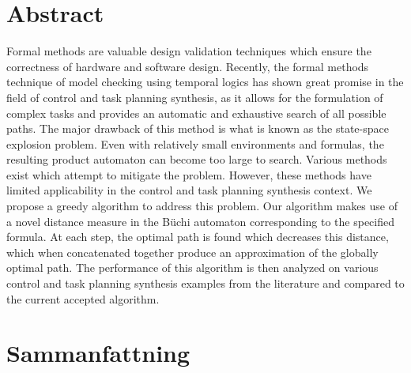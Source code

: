 \section*{\centering Abstract}
Formal methods are valuable design validation techniques which ensure the correctness of hardware and software design. Recently, the formal methods technique of model checking using temporal logics has shown great promise in the field of control and task planning synthesis, as it allows for the formulation of complex tasks and provides an automatic and exhaustive search of all possible paths. The major drawback of this method is what is known as the state-space explosion problem. Even with relatively small environments and formulas, the resulting product automaton can become too large to search. Various methods exist which attempt to mitigate the problem. However, these methods have limited applicability in the control and task planning synthesis context. We propose a greedy algorithm to address this problem. Our algorithm makes use of a novel distance measure in the B\"uchi automaton corresponding to the specified formula. At each step, the optimal path is found which decreases this distance, which when concatenated together produce an approximation of the globally optimal path. The performance of this algorithm is then analyzed on various control and task planning synthesis examples from the literature and compared to the current accepted algorithm.     





\newpage

\section*{\centering Sammanfattning}

